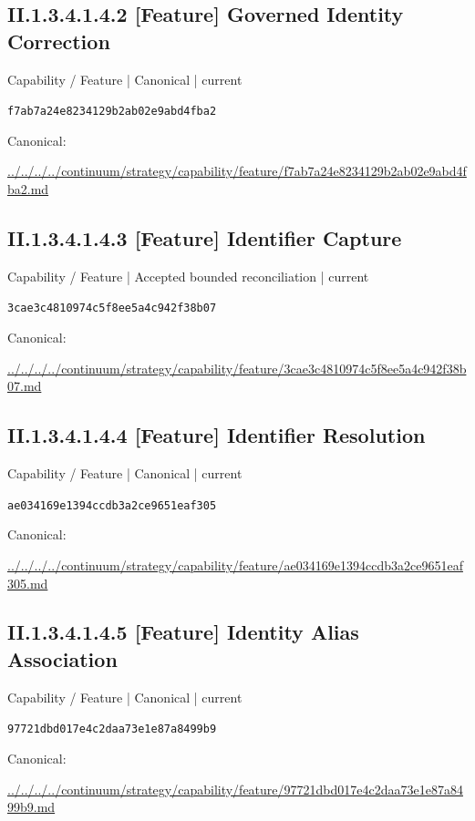 \documentclass[10pt,a4paper]{article}
\begin{document}
\subsection*{II.1.3.4.1.4.2 [Feature] Governed Identity Correction}
\label{element-f7ab7a24e8234129b2ab02e9abd4fba2}
{\small Capability / Feature | Canonical | current}\par
\texttt{f7ab7a24e8234129b2ab02e9abd4fba2}\par
Canonical: \par
{\footnotesize\url{../../../../continuum/strategy/capability/feature/f7ab7a24e8234129b2ab02e9abd4fba2.md}}\par
\subsection*{II.1.3.4.1.4.3 [Feature] Identifier Capture}
\label{element-3cae3c4810974c5f8ee5a4c942f38b07}
{\small Capability / Feature | Accepted bounded reconciliation | current}\par
\texttt{3cae3c4810974c5f8ee5a4c942f38b07}\par
Canonical: \par
{\footnotesize\url{../../../../continuum/strategy/capability/feature/3cae3c4810974c5f8ee5a4c942f38b07.md}}\par
\subsection*{II.1.3.4.1.4.4 [Feature] Identifier Resolution}
\label{element-ae034169e1394ccdb3a2ce9651eaf305}
{\small Capability / Feature | Canonical | current}\par
\texttt{ae034169e1394ccdb3a2ce9651eaf305}\par
Canonical: \par
{\footnotesize\url{../../../../continuum/strategy/capability/feature/ae034169e1394ccdb3a2ce9651eaf305.md}}\par
\subsection*{II.1.3.4.1.4.5 [Feature] Identity Alias Association}
\label{element-97721dbd017e4c2daa73e1e87a8499b9}
{\small Capability / Feature | Canonical | current}\par
\texttt{97721dbd017e4c2daa73e1e87a8499b9}\par
Canonical: \par
{\footnotesize\url{../../../../continuum/strategy/capability/feature/97721dbd017e4c2daa73e1e87a8499b9.md}}\par
\end{document}
